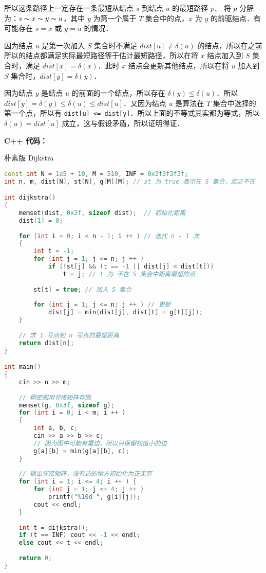所以这条路径上一定存在一条最短从结点 $s$ 到结点 $u$ 的最短路径 $p$．
将 $p$ 分解为：$s \thicksim x \thicksim y \thicksim u$，其中 $y$ 为第一个属于 $T$ 集合中的点，$x$ 为 $y$ 的前驱结点．有可能存在 $s = x$ 或 $y = u$ 的情况．

因为结点 $u$ 是第一次加入 $S$ 集合时不满足 $dist[u] \neq \delta(u)$ 的结点，所以在之前所以的结点都满足实际最短路径等于估计最短路径，所以在将 $x$ 结点加入到 $S$ 集合时，满足 $dist[x] = \delta(x)$．此时 $x$ 结点会更新其他结点，所以在将 $u$ 加入到 $S$ 集合时，$dist[y] = \delta(y)$．

因为结点 $y$ 是结点 $u$ 的前面的一个结点，所以存在 $\delta(y) \leq \delta(u)$．所以 $dist[y] = \delta(y) \leq \delta(u) \leq dist[u]$．又因为结点 $u$ 是算法在 $T$ 集合中选择的第一个点，所以有 \verb|dist[u] <= dist[y]|．所以上面的不等式其实都为等式，所以 $\delta(u) = dist[u]$ 成立，这与假设矛盾，所以证明得证．

\textbf{C++ 代码：}

朴素版 Dijkstra
\begin{lstlisting}[language=cpp]
const int N = 1e5 + 10, M = 510, INF = 0x3f3f3f3f;
int n, m, dist[N], st[N], g[M][M]; // st 为 true 表示在 S 集合，反之不在

int dijkstra()
{
    memset(dist, 0x3f, sizeof dist);  // 初始化距离
    dist[1] = 0;
    
    for (int i = 0; i < n - 1; i ++ ) // 迭代 n - 1 次
    {
        int t = -1;
        for (int j = 1; j <= n; j ++ )
            if (!st[j] && (t == -1 || dist[j] < dist[t]))
                t = j; // t 为 不在 S 集合中距离最短的点
        
        st[t] = true; // 加入 S 集合
        
        for (int j = 1; j <= n; j ++ ) // 更新
            dist[j] = min(dist[j], dist[t] + g[t][j]);
    }
    
    // 求 1 号点到 n 号点的最短距离
    return dist[n];
}

int main()
{
    cin >> n >> m;
    
    // 稠密图用邻接矩阵存图
    memset(g, 0x3f, sizeof g);
    for (int i = 0; i < m; i ++ ) 
    {
        int a, b, c;
        cin >> a >> b >> c;
        // 因为图中可能有重边，所以只保留权值小的边
        g[a][b] = min(g[a][b], c);
    }
    
    // 输出邻接矩阵，没有边的地方初始化为正无穷
    for (int i = 1; i <= 4; i ++ ) {
        for (int j = 1; j <= 4; j ++ )
            printf("%10d ", g[i][j]);
        cout << endl;
    }
    
    int t = dijkstra();
    if (t == INF) cout << -1 << endl; 
    else cout << t << endl;
    
    return 0;
}
\end{lstlisting}


